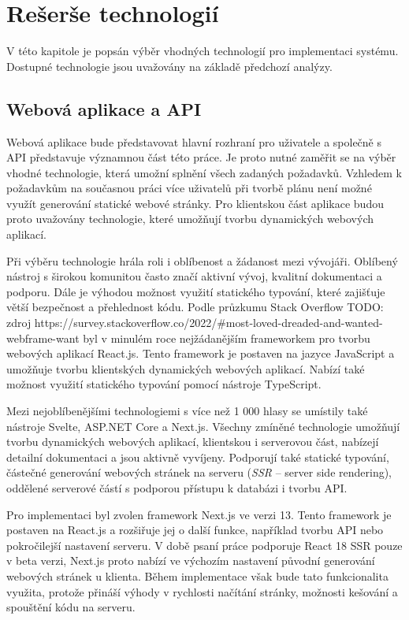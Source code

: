 \chapter{Rešerše technologií}

V této kapitole je popsán výběr vhodných technologií pro implementaci systému. Dostupné technologie jsou uvažovány na základě předchozí analýzy.

\section{Webová aplikace a API}

Webová aplikace bude představovat hlavní rozhraní pro uživatele a společně s API představuje významnou část této práce.
Je proto nutné zaměřit se na výběr vhodné technologie, která umožní splnění všech zadaných požadavků.
Vzhledem k požadavkům na současnou práci více uživatelů při tvorbě plánu není možné využít generování statické webové stránky. Pro klientskou část
aplikace budou proto uvažovány technologie, které umožňují tvorbu dynamických webových aplikací.

Při výběru technologie hrála roli i oblíbenost a žádanost mezi vývojáři. Oblíbený nástroj s širokou komunitou často značí aktivní vývoj, kvalitní dokumentaci
a podporu. Dále je výhodou možnost využití statického typování, které zajišťuje větší bezpečnost a přehlednost kódu. Podle průzkumu Stack Overflow TODO: zdroj https://survey.stackoverflow.co/2022/\#most-loved-dreaded-and-wanted-webframe-want
byl v minulém roce nejžádanějším frameworkem pro tvorbu webových aplikací React.js. Tento framework je postaven na jazyce JavaScript a umožňuje tvorbu klientských
dynamických webových aplikací. Nabízí také možnost využití statického typování pomocí nástroje TypeScript.

Mezi nejoblíbenějšími technologiemi s více než 1 000 hlasy se umístily také nástroje Svelte, ASP.NET Core a Next.js. Všechny zmíněné technologie umožňují tvorbu dynamických webových aplikací,
klientskou i serverovou část, nabízejí detailní dokumentaci a jsou aktivně vyvíjeny. Podporují také statické typování, částečné generování webových stránek na serveru (\textit{SSR} -- server side rendering),
oddělené serverové částí s podporou přístupu k databázi i tvorbu API.

Pro implementaci byl zvolen framework Next.js ve verzi 13. Tento framework je postaven na React.js a rozšiřuje jej o další funkce, například tvorbu API nebo pokročilejší nastavení serveru.
V době psaní práce podporuje React 18 SSR pouze v beta verzi, Next.js proto nabízí ve výchozím nastavení původní generování webových stránek u klienta.
Během implementace však bude tato funkcionalita využita, protože přináší výhody v rychlosti načítání stránky, možnosti kešování a spouštění kódu na serveru.

